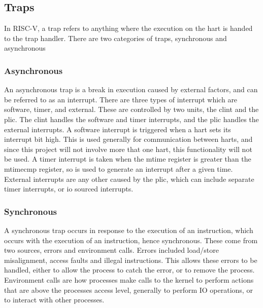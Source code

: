 \subsection{Traps}
In RISC-V, a trap refers to anything where the execution on the hart is handed to the trap handler. There are two categories of traps, synchronous and asynchronous
\subsubsection{Asynchronous}
An asynchronous trap is a break in execution caused by external factors, and can be referred to as an interrupt. There are three types of interrupt which are software, timer, and external. These are controlled by two units, the \ac{clint} and the \ac{plic}. The \ac{clint} handles the software and timer interrupts, and the \ac{plic} handles the external interrupts. A software interrupt is triggered when a hart sets its interrupt bit high. This is used generally for communication between harts, and since this project will not involve more that one hart, this functionality will not be used. A timer interrupt is taken when the mtime register is greater than the mtimecmp register, so is used to generate an interrupt after a given time. External interrupts are any other caused by the \ac{plic}, which can include separate timer interrupts, or \ac{io} sourced interrupts\cite{sifive_manual}.
\subsubsection{Synchronous}
A synchronous trap occurs in response to the execution of an instruction, which occurs with the execution of an instruction, hence synchronous. These come from two sources, errors and environment calls. Errors included load/store misalignment, access faults and illegal instructions. This allows these errors to be handled, either to allow the process to catch the error, or to remove the process. Environment calls are how processes make calls to the kernel to perform actions that are above the processes access level, generally to perform IO operations, or to interact with other processes.
